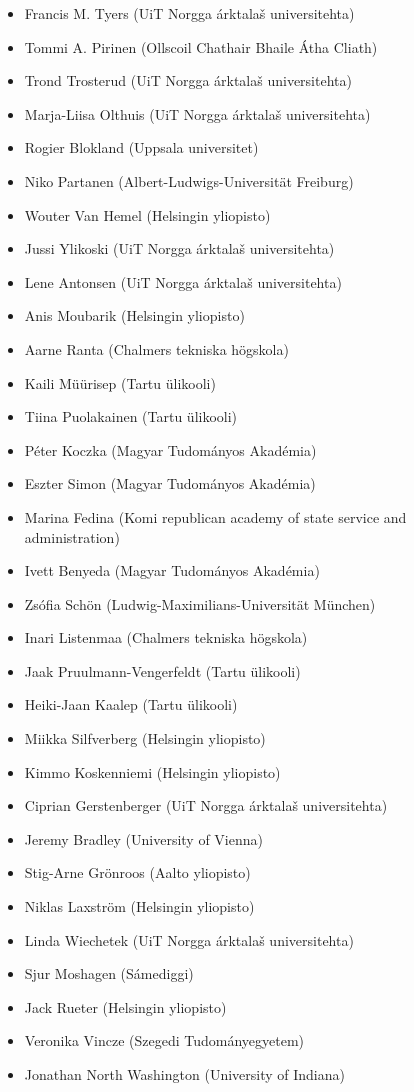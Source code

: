 \documentclass[11pt,a4paper]{article}
\begin{document}
\begin{itemize}
  \item Francis M. Tyers (UiT Norgga árktalaš universitehta)
  \item Tommi A. Pirinen (Ollscoil Chathair Bhaile Átha Cliath)
  \item Trond Trosterud (UiT Norgga árktalaš universitehta)
  \item Marja-Liisa Olthuis (UiT Norgga árktalaš universitehta)
  \item Rogier Blokland (Uppsala universitet)
  \item Niko Partanen (Albert-Ludwigs-Universität Freiburg)
  \item Wouter Van Hemel (Helsingin yliopisto)
  \item Jussi Ylikoski (UiT Norgga árktalaš universitehta)
  \item Lene Antonsen (UiT Norgga árktalaš universitehta)
  \item Anis Moubarik (Helsingin yliopisto)
  \item Aarne Ranta (Chalmers tekniska högskola)
  \item Kaili Müürisep (Tartu ülikooli)
  \item Tiina Puolakainen (Tartu ülikooli)
  \item Péter Koczka (Magyar Tudományos Akadémia)
  \item Eszter Simon (Magyar Tudományos Akadémia)
  \item Marina Fedina (Komi republican academy of state service and administration)
  \item Ivett Benyeda (Magyar Tudományos Akadémia)
  \item Zsófia Schön (Ludwig-Maximilians-Universität München)
  \item Inari Listenmaa (Chalmers tekniska högskola)
  \item Jaak Pruulmann-Vengerfeldt (Tartu ülikooli)
  \item Heiki-Jaan Kaalep (Tartu ülikooli)
  \item Miikka Silfverberg (Helsingin yliopisto)
  \item Kimmo Koskenniemi (Helsingin yliopisto)
  \item Ciprian Gerstenberger (UiT Norgga árktalaš universitehta)
  \item Jeremy Bradley (University of Vienna)
  \item Stig-Arne Grönroos (Aalto yliopisto)
  \item Niklas Laxström (Helsingin yliopisto)
  \item Linda Wiechetek (UiT Norgga árktalaš universitehta)
  \item Sjur Moshagen (Sámediggi)
  \item Jack Rueter (Helsingin yliopisto)
  \item Veronika Vincze (Szegedi Tudományegyetem)
  \item Jonathan North Washington (University of Indiana)
\end{itemize}
\end{document}
